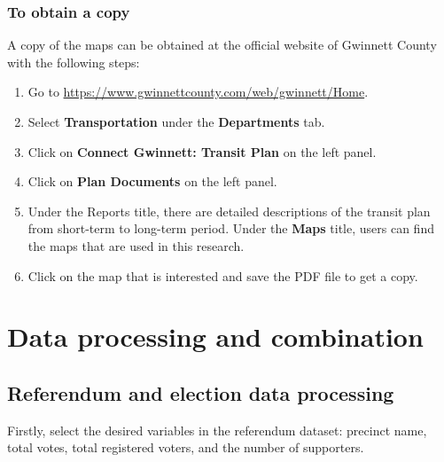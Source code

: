 \documentclass[
]{article}
\newenvironment{Shaded}{\begin{snugshade}}{\end{snugshade}}
\newcommand{\KeywordTok}[1]{\textcolor[rgb]{0.13,0.29,0.53}{\textbf{#1}}}
\newcommand{\NormalTok}[1]{#1}
\newcommand{\OperatorTok}[1]{\textcolor[rgb]{0.81,0.36,0.00}{\textbf{#1}}}
\newcommand{\StringTok}[1]{\textcolor[rgb]{0.31,0.60,0.02}{#1}}
\providecommand{\tightlist}{%
  \setlength{\itemsep}{0pt}\setlength{\parskip}{0pt}}
\begin{document}
\hypertarget{to-obtain-a-copy-3}{%
\subsubsection{To obtain a copy}\label{to-obtain-a-copy-3}}

A copy of the maps can be obtained at the official website of Gwinnett
County with the following steps:

\begin{enumerate}
\def\labelenumi{\arabic{enumi}.}
\tightlist
\item
  Go to \url{https://www.gwinnettcounty.com/web/gwinnett/Home}.
\item
  Select \textbf{Transportation} under the \textbf{Departments} tab.
\item
  Click on \textbf{Connect Gwinnett: Transit Plan} on the left panel.
\item
  Click on \textbf{Plan Documents} on the left panel.
\item
  Under the Reports title, there are detailed descriptions of the
  transit plan from short-term to long-term period. Under the
  \textbf{Maps} title, users can find the maps that are used in this
  research.
\item
  Click on the map that is interested and save the PDF file to get a
  copy.
\end{enumerate}

\hypertarget{data-processing-and-combination}{%
\section{Data processing and
combination}\label{data-processing-and-combination}}

\hypertarget{referendum-and-election-data-processing}{%
\subsection{Referendum and election data
processing}\label{referendum-and-election-data-processing}}

Firstly, select the desired variables in the referendum dataset:
precinct name, total votes, total registered voters, and the number of
supporters.

\begin{Shaded}
\end{Shaded}
\end{document}
